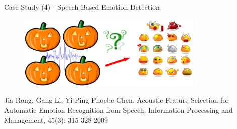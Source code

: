 \documentclass[
 size=14pt,
 paper=smartboard,  %
 mode=present, 		%
 display=slides, 	%
 pauseslide,
 fleqn,leqno]{powerdot}{}
\begin{document}
\begin{slide}{Case Study (4) - Speech Based Emotion Detection}

\begin{figure}
  \includegraphics[width=0.8\textwidth]{figures//theme1//Theme1_22.eps}
\end{figure}

\begin{thebibliography}{}
\bibitem{}
\small{Jia Rong, Gang Li, Yi-Ping Phoebe Chen.
Acoustic Feature Selection for Automatic Emotion Recognition from Speech.
Information Processing and Management, 45(3):  315-328 2009}
\end{thebibliography}

\end{slide}
\end{document}
